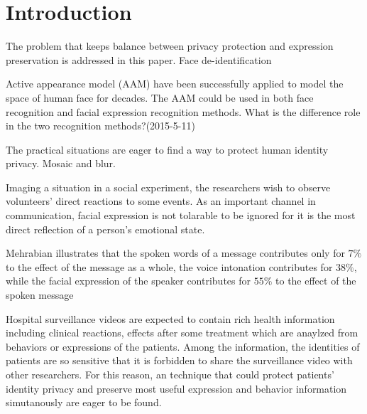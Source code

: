 
\chapter{Introduction}

The problem that keeps balance between privacy protection and expression preservation is addressed in this paper. 
Face de-identification 

\par
Active appearance model (AAM) have been successfully applied to model the space of human face for decades. The AAM could be used in both face recognition and facial expression recognition methods. What is the difference role in the two recognition methods?(2015-5-11)

\par
The practical situations are eager to find a way to protect human identity privacy. Mosaic and blur.

\par
Imaging a situation in a social experiment, the researchers wish to observe volunteers' direct reactions to some events. As an important channel in communication, facial expression is not tolarable to be ignored for it is the most direct reflection of a person's emotional state. 

\par
Mehrabian illustrates that the spoken words of a message contributes only for $7\%$ to the effect of the message as a whole, the voice intonation contributes for $38\%$, while the facial expression of the speaker contributes for $55\%$ to the effect of the spoken message ~\cite{Meh68}

\par
Hospital surveillance videos are expected to contain rich health information including clinical reactions, effects after some treatment which are anaylzed from behaviors or expressions of the patients. Among the information, the identities of patients are so sensitive that it is forbidden to share the surveillance video with other researchers. For this reason, an technique that could protect patients' identity privacy and preserve most useful expression and behavior information simutanously are eager to be found.